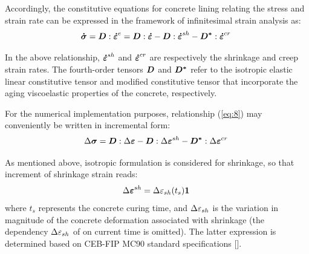 \documentclass[a4paper,fleqn]{cas-sc}
\begin{document}
Accordingly, the constitutive equations for concrete lining relating the stress and strain rate can be expressed in the framework of infinitesimal strain analysis as:
\begin{equation} \label{eq:8}
	\boldsymbol{\dot{\sigma}} = \boldsymbol{D} : \boldsymbol{\dot{\varepsilon}}^{e} = \boldsymbol{D} : \boldsymbol{\dot{\varepsilon}} - \boldsymbol{D} : \boldsymbol{\dot{\varepsilon}}^{sh} - \boldsymbol{D^{*}} : \boldsymbol{\dot{\varepsilon}}^{cr}\;
\end{equation}

In the above relationship, $\boldsymbol{\dot{\varepsilon}}^{sh}$  and $\boldsymbol{\dot{\varepsilon}}^{cr}$ are respectively the shrinkage and creep strain rates. The fourth-order tensors $\boldsymbol{D}$ and $\boldsymbol{D^{*}}$ refer to the isotropic elastic linear constitutive tensor and modified constitutive tensor that incorporate the aging viscoelastic properties of the concrete, respectively.

For the numerical implementation purposes, relationship (\ref{eq:8}) may conveniently be written in incremental form: 
\begin{equation} \label{eq:9}
	\Delta \boldsymbol{\sigma} = \boldsymbol{D} : \Delta \boldsymbol{\varepsilon} - \boldsymbol{D} : \Delta \boldsymbol{\varepsilon}^{sh} - \boldsymbol{D^{*}} : \Delta \boldsymbol{\varepsilon}^{cr} \;
\end{equation}

As mentioned above, isotropic formulation is considered for shrinkage, so that increment of shrinkage strain reads:
\begin{equation} \label{eq:10}
	\Delta \boldsymbol{\varepsilon}^{sh} =  \Delta \varepsilon_{sh}(t_{s}) \boldsymbol{1} \;
\end{equation}
where $t_{s}$ represents the concrete curing time, and $\Delta \varepsilon_{sh}$ is the variation in magnitude of the concrete deformation associated with shrinkage (the dependency $\Delta \varepsilon_{sh}$ of on current time is omitted). The latter expression is determined based on CEB-FIP MC90 standard specifications []. 
\end{document}
